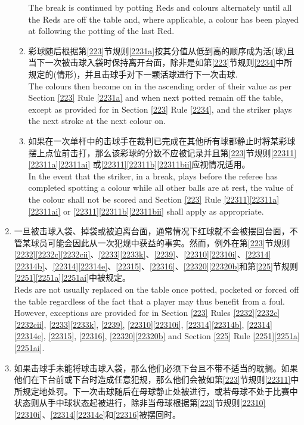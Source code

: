 \begin{enumerate}[label=(\alph*)]
\begin{enumerate}[label=(\roman*)]
        The break is continued by potting Reds and colours alternately until all the Reds are off the table and, where applicable, a colour has been played at following the potting of the last Red.
        \item \label{2233hiii}彩球随后根据第\ref{223}节规则\ref{2231a}按其分值从低到高的顺序成为活(球)且当下一次被击球入袋时保持离开台面，除非是如第\ref{223}节规则\ref{2234}中所规定的(情形)，并且击球手对下一颗活球进行下一次击球.\\
        The colours then become on in the ascending order of their value as per Section \ref{223} Rule \ref{2231a} and when next potted remain off the table, except as provided for in Section \ref{223} Rule \ref{2234}, and the striker plays the next stroke at the next colour on.
        \item 如果在一次单杆中的击球手在裁判已完成在其他所有球都静止时将某彩球摆上点位前击打，那么该彩球的分数不应被记录并且第\ref{223}节规则\ref{22311}\ref{22311a}\ref{22311ai} 或\ref{22311}\ref{22311b}\ref{22311bii}应视情况适用。\\
        In the event that the striker, in a break, plays before the referee has completed spotting a colour while all other balls are at rest, the value of the colour shall not be scored and Section \ref{223} Rule \ref{22311}\ref{22311a} \ref{22311ai} or \ref{22311}\ref{22311b}\ref{22311bii} shall apply as appropriate.
    \end{enumerate}
    \item 一旦被击球入袋、掉袋或被迫离台面，通常情况下红球就不会被摆回台面，不管某球员可能会因此从一次犯规中获益的事实。然而，例外在第\ref{223}节规则\ref{2232}\ref{2232c}\ref{2232cii}、\ref{2233}\ref{2233k}、\ref{2239}、\ref{22310}\ref{22310i}、\ref{22314}\ref{22314b}、\ref{22314}\ref{22314e}、\ref{22315}、\ref{22316}、\ref{22320}\ref{22320b}和第\ref{225}节规则\ref{2251}\ref{2251a}\ref{2251ai}中被规定。\\
    Reds are not usually replaced on the table once potted, pocketed or forced off the table regardless of the fact that a player may thus benefit from a foul. However, exceptions are provided for in Section \ref{223} Rules \ref{2232}\ref{2232c}\ref{2232cii}, \ref{2233}\ref{2233k}, \ref{2239}, \ref{22310}\ref{22310i}, \ref{22314}\ref{22314b}, \ref{22314}\ref{22314e}, \ref{22315}, \ref{22316}, \ref{22320}\ref{22320b} and Section \ref{225} Rule \ref{2251}\ref{2251a}\ref{2251ai}.
    \item 如果击球手未能将球击球入袋，那么他们必须下台且不带不适当的耽搁。如果他们在下台前或下台时造成任意犯规，那么他们会被如第\ref{223}节规则\ref{22311}中所规定地处罚。下一次击球随后在母球静止处被进行，或若母球不处于比赛中状态则从手中球状态起被进行，除非当母球根据第\ref{223}节规则\ref{22310}\ref{22310i}、\ref{22314}\ref{22314e}和\ref{22316}被摆回时。\\

\end{enumerate}
